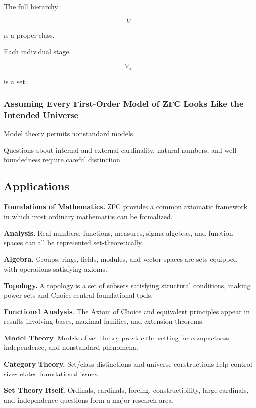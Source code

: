 The full hierarchy

\[
V
\]

is a proper class.

Each individual stage

\[
V_\alpha
\]

is a set.

\subsubsection{Assuming Every First-Order Model of ZFC Looks Like the Intended Universe}

Model theory permits nonstandard models.

Questions about internal and external cardinality, natural numbers, and
well-foundedness require careful distinction.

\subsection{Applications}
\label{subsec:axiomatic-set-theory-applications}

\begin{applicationbox}

\textbf{Foundations of Mathematics.}
ZFC provides a common axiomatic framework in which most ordinary
mathematics can be formalized.

\medskip

\textbf{Analysis.}
Real numbers, functions, measures, sigma-algebras, and function spaces can
all be represented set-theoretically.

\medskip

\textbf{Algebra.}
Groups, rings, fields, modules, and vector spaces are sets equipped with
operations satisfying axioms.

\medskip

\textbf{Topology.}
A topology is a set of subsets satisfying structural conditions, making
power sets and Choice central foundational tools.

\medskip

\textbf{Functional Analysis.}
The Axiom of Choice and equivalent principles appear in results involving
bases, maximal families, and extension theorems.

\medskip

\textbf{Model Theory.}
Models of set theory provide the setting for compactness, independence,
and nonstandard phenomena.

\medskip

\textbf{Category Theory.}
Set/class distinctions and universe constructions help control
size-related foundational issues.

\medskip

\textbf{Set Theory Itself.}
Ordinals, cardinals, forcing, constructibility, large cardinals, and
independence questions form a major research area.

\end{applicationbox}

